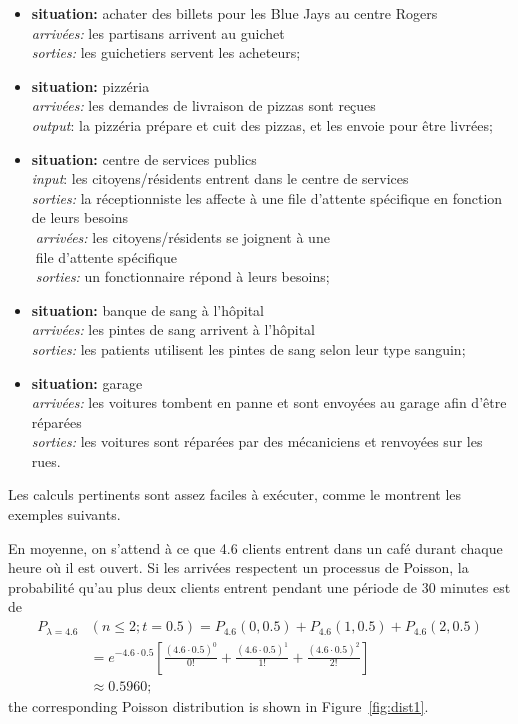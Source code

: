 \begin{itemize}
\item \textbf{situation:} achater des billets pour les Blue Jays au centre Rogers\\ \textit{arriv\'ees:} les partisans arrivent au guichet\\ \textit{sorties:} les guichetiers servent les acheteurs;
\item \textbf{situation:} pizzéria \\ \textit{arriv\'ees:} les demandes de livraison de pizzas sont reçues \\\textit{output}: la pizzéria prépare et cuit des pizzas, et les envoie pour être livrées; 
\item \textbf{situation:} centre de services publics\\ \textit{input}: les citoyens/résidents entrent dans le centre de services \\ \textit{sorties:} la réceptionniste les affecte à une file d'attente spécifique en fonction de leurs besoins\\
\textcolor{white}{.}\qquad \textit{arriv\'ees:} les citoyens/résidents se joignent à une \\ \textcolor{white}{.}\qquad file d'attente spécifique  \\ \textcolor{white}{.}\qquad \textit{sorties:} un fonctionnaire répond à leurs besoins;
\item \textbf{situation:} banque de sang à l'hôpital\\ \textit{arriv\'ees:} les pintes de sang arrivent \`a l'hôpital\\ \textit{sorties:} les patients utilisent les pintes de sang selon leur type sanguin;
\item \textbf{situation:} garage\\ \textit{arriv\'ees:} les voitures tombent en panne et sont envoyées au garage afin d'être réparées\\ \textit{sorties:} les voitures sont réparées par des mécaniciens et renvoyées sur les rues.
\end{itemize}
Les calculs pertinents sont assez faciles à exécuter, comme le montrent les exemples suivants.
\begin{Example} En moyenne, on s’attend à ce que 4.6 clients entrent dans un café durant chaque heure où il est ouvert. Si les arrivées respectent un processus de Poisson, la probabilité qu'au plus deux clients entrent pendant une période de 30 minutes est de \begin{align*}P_{\lambda=4.6}&(n\leq 2;t=0.5)=P_{4.6}(0,0.5)+P_{4.6}(1,0.5)+P_{4.6}(2,0.5) \\ &=e^{-4.6\cdot 0.5}\left[\frac{(4.6\cdot 0.5)^0}{0!}+\frac{(4.6\cdot 0.5)^1}{1!}+\frac{(4.6\cdot 0.5)^2}{2!}\right] \\ &\approx 0.5960; \end{align*} the corresponding Poisson distribution is shown in Figure~\ref{fig:dist1}.
\end{Example}
